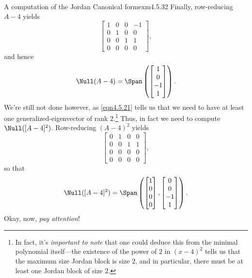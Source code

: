 \begin{exm}{A computation of the Jordan Canonical form}{exm4.5.32}
	Finally, row-reducing $A-4$ yields
	\begin{equation}
		\begin{bmatrix}1 & 0 & 0 & -1 \\ 0 & 1 & 0 & 0 \\ 0 & 0 & 1 & 1 \\ 0 & 0 & 0 & 0\end{bmatrix},
	\end{equation}
	and hence
	\begin{equation}\label{eqn4.5.27}
		\Null (A-4)=\Span \left( \begin{bmatrix}1 \\ 0 \\ -1 \\ 1\end{bmatrix}\right) .
	\end{equation}
	We're still not done however, as \eqref{eqn4.5.21} tells us that we need to have at least one generalized-eigenvector of rank $2$.\footnote{In fact, it's \emph{important to note} that one could deduce this from the minimal polynomial itself---the existence of the power of $2$ in $(x-4)^2$ tells us that the maximum size Jordan block is size $2$, and in particular, there must be at least one Jordan block of size $2$.}  Thus, in fact we need to compute $\Null ([A-4]^2)$.  Row-reducing $(A-4)^2$ yields
	\begin{equation}
		\begin{bmatrix}0 & 1 & 0 & 0 \\ 0 & 0 & 1 & 1 \\ 0 & 0 & 0 & 0 \\ 0 & 0 & 0 & 0\end{bmatrix},
	\end{equation}
	so that
	\begin{equation}\label{eqn4.5.29}
		\Null ([A-4]^2)=\Span \left( \begin{bmatrix}1 \\ 0 \\ 0 \\ 0\end{bmatrix},\begin{bmatrix}0 \\ 0 \\ -1 \\ 1\end{bmatrix}\right) .
	\end{equation}
	Okay, now, \emph{pay attention}!
	

\end{exm}
